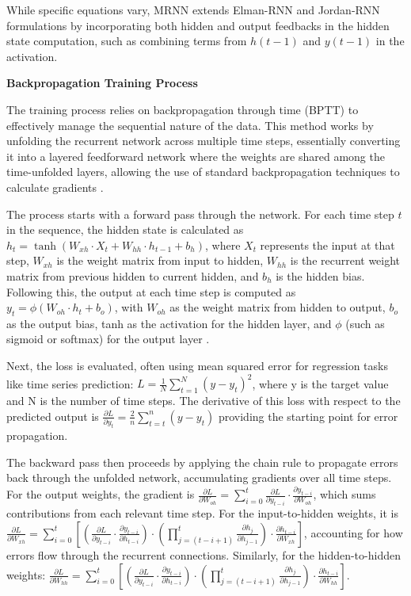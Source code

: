 \documentclass[conference, 10pt]{IEEEtran}
\begin{document}
While specific equations vary, MRNN extends Elman-RNN and Jordan-RNN formulations by incorporating both hidden and
output feedbacks in the hidden state computation, such as combining terms from \( h(t-1) \) and \( y(t-1) \) in the
activation.

\textbf{Backpropagation Training Process} 

The training process relies on backpropagation through time (BPTT) to effectively manage the sequential nature of the
data. This method works by unfolding the recurrent network across multiple time steps, essentially converting it into a
layered feedforward network where the weights are shared among the time-unfolded layers, allowing the use of standard
backpropagation techniques to calculate gradients \cite{quarkmlBackpropagationThrough}.

The process starts with a forward pass through the network. For each time step $t$ in the sequence, the hidden state is
calculated as \( h_t = \tanh(W_{xh} \cdot X_t + W_{hh} \cdot h_{t-1} + b_h) \), where \( X_t \) represents the input at
that step, \( W_{xh} \) is the weight matrix from input to hidden, \( W_{hh} \) is the recurrent weight matrix from
previous hidden to current hidden, and \( b_h \) is the hidden bias. Following this, the output at each time step is
computed as \( y_t = \phi(W_{oh} \cdot h_t + b_o) \), with \( W_{oh} \) as the weight matrix from hidden to output, \(
b_o \) as the output bias, tanh as the activation for the hidden layer, and \( \phi \) (such as sigmoid or softmax) for
the output layer \cite{quarkmlBackpropagationThrough}.

Next, the loss is evaluated, often using mean squared error for regression tasks like time series prediction: \( L =
\frac{1}{N} \sum_{t=1}^{N} (y - y_t)^2 \), where y is the target value and N is the number of time steps. The derivative
of this loss with respect to the predicted output is \( \frac{\partial{L}}{\partial{y_t}} = \frac{2}{n}\sum_{t=t}^{n}(y
- y_t) \) providing the starting point for error propagation.

The backward pass then proceeds by applying the chain rule to propagate errors back through the unfolded network,
accumulating gradients over all time steps. For the output weights, the gradient is \( \frac{\partial L}{\partial
W_{oh}} = \sum_{i=0}^{t} \frac{\partial L}{\partial y_{t-i}} \cdot \frac{\partial y_{t-i}}{\partial W_{oh}} \), which
sums contributions from each relevant time step. For the input-to-hidden weights, it is \( \frac{\partial L}{\partial
W_{xh}} = \sum_{i=0}^{t} \left[ \left( \frac{\partial L}{\partial y_{t-i}} \cdot \frac{\partial y_{t-i}}{\partial
h_{t-i}} \right) \cdot \left( \prod_{j=(t-i+1)}^{t} \frac{\partial h_j}{\partial h_{j-1}} \right) \cdot \frac{\partial
h_{t-i}}{\partial W_{xh}} \right] \), accounting for how errors flow through the recurrent connections. Similarly, for
the hidden-to-hidden weights: \( \frac{\partial L}{\partial W_{hh}} = \sum_{i=0}^{t} \left[ \left( \frac{\partial
L}{\partial y_{t-i}} \cdot \frac{\partial y_{t-i}}{\partial h_{t-i}} \right) \cdot \left( \prod_{j=(t-i+1)}^{t}
\frac{\partial h_j}{\partial h_{j-1}} \right) \cdot \frac{\partial h_{t-i}}{\partial W_{hh}} \right] \). 
\end{document}

